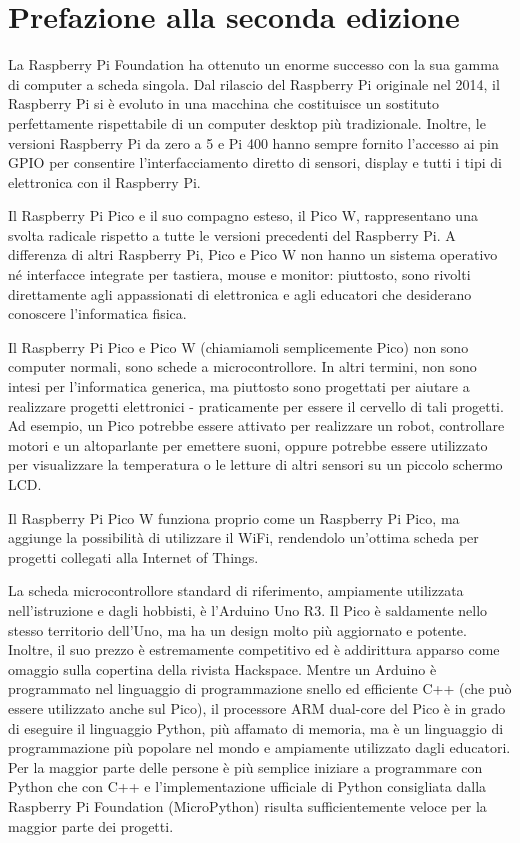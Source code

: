 \maketitle


\section*{Prefazione alla seconda edizione}

La Raspberry Pi Foundation ha ottenuto un enorme successo con la sua gamma di computer a scheda singola. Dal rilascio del Raspberry Pi originale nel 2014, il Raspberry Pi si è evoluto in una macchina che costituisce un sostituto perfettamente rispettabile di un computer desktop più tradizionale. Inoltre, le versioni Raspberry Pi da zero a 5 e Pi 400 hanno sempre fornito l'accesso ai pin GPIO per consentire l'interfacciamento diretto di sensori, display e tutti i tipi di elettronica con il Raspberry Pi.

Il Raspberry Pi Pico e il suo compagno esteso, il Pico W, rappresentano una svolta radicale rispetto a tutte le versioni precedenti del Raspberry Pi. A differenza di altri Raspberry Pi, Pico e Pico W non hanno un sistema operativo né interfacce integrate per tastiera, mouse e monitor: piuttosto, sono rivolti direttamente agli appassionati di elettronica e agli educatori che desiderano conoscere l'informatica fisica.

Il Raspberry Pi Pico e Pico W (chiamiamoli semplicemente Pico) non sono computer normali, sono schede a microcontrollore. In altri termini, non sono intesi per l'informatica generica, ma piuttosto sono progettati per aiutare a realizzare progetti elettronici - praticamente per essere il cervello di tali progetti. Ad esempio, un Pico potrebbe essere attivato per realizzare un robot, controllare motori e un altoparlante per emettere suoni, oppure potrebbe essere utilizzato per visualizzare la temperatura o le letture di altri sensori su un piccolo schermo LCD.

Il Raspberry Pi Pico W funziona proprio come un Raspberry Pi Pico, ma aggiunge la possibilità di utilizzare il WiFi, rendendolo un'ottima scheda per progetti collegati alla Internet of Things.

La scheda microcontrollore standard di riferimento, ampiamente utilizzata nell'istruzione e dagli hobbisti, è l'Arduino Uno R3. Il Pico è saldamente nello stesso territorio dell'Uno, ma ha un design molto più aggiornato e potente. Inoltre, il suo prezzo è estremamente competitivo ed è addirittura apparso come omaggio sulla copertina della rivista Hackspace. Mentre un Arduino è programmato nel linguaggio di programmazione snello ed efficiente C++ (che può essere utilizzato anche sul Pico), il processore ARM dual-core del Pico è in grado di eseguire il linguaggio Python, più affamato di memoria, ma è un linguaggio di programmazione più popolare nel mondo e ampiamente utilizzato dagli educatori. Per la maggior parte delle persone è più semplice iniziare a programmare con Python che con C++ e l'implementazione ufficiale di Python consigliata dalla Raspberry Pi Foundation (MicroPython) risulta sufficientemente veloce per la maggior parte dei progetti.



